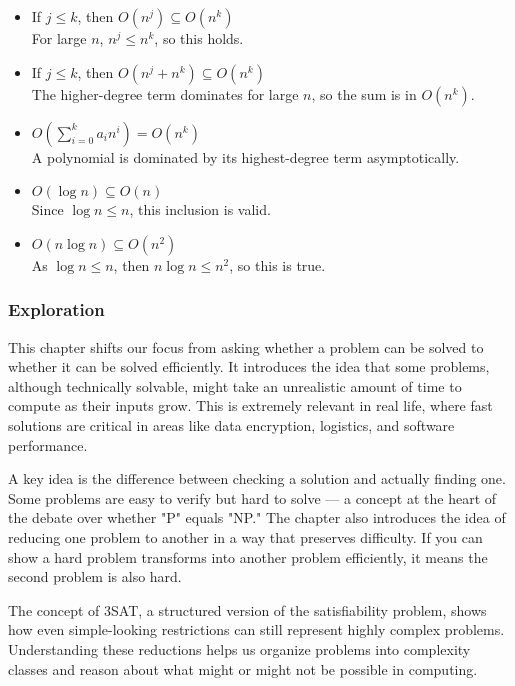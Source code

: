 \documentclass{article}
\theoremstyle{theorem}
\theoremstyle{definition}
\theoremstyle{remark}
\begin{document}
\begin{itemize}
    \item If \( j \leq k \), then \( O(n^j) \subseteq O(n^k) \) \\
    For large \( n \), \( n^j \leq n^k \), so this holds.

    \item If \( j \leq k \), then \( O(n^j + n^k) \subseteq O(n^k) \) \\
    The higher-degree term dominates for large \( n \), so the sum is in \( O(n^k) \).

    \item \( O\left(\sum_{i=0}^{k} a_i n^i\right) = O(n^k) \) \\
    A polynomial is dominated by its highest-degree term asymptotically.

    \item \( O(\log n) \subseteq O(n) \) \\
    Since \( \log n \leq n \), this inclusion is valid.

    \item \( O(n \log n) \subseteq O(n^2) \) \\
    As \( \log n \leq n \), then \( n \log n \leq n^2 \), so this is true.
\end{itemize}


\subsubsection{Exploration}

This chapter shifts our focus from asking whether a problem can be solved to whether it can be solved efficiently. It introduces the idea that some problems, although technically solvable, might take an unrealistic amount of time to compute as their inputs grow. This is extremely relevant in real life, where fast solutions are critical in areas like data encryption, logistics, and software performance.

A key idea is the difference between checking a solution and actually finding one. Some problems are easy to verify but hard to solve — a concept at the heart of the debate over whether "P" equals "NP." The chapter also introduces the idea of reducing one problem to another in a way that preserves difficulty. If you can show a hard problem transforms into another problem efficiently, it means the second problem is also hard.

The concept of 3SAT, a structured version of the satisfiability problem, shows how even simple-looking restrictions can still represent highly complex problems. Understanding these reductions helps us organize problems into complexity classes and reason about what might or might not be possible in computing.
\end{document}

